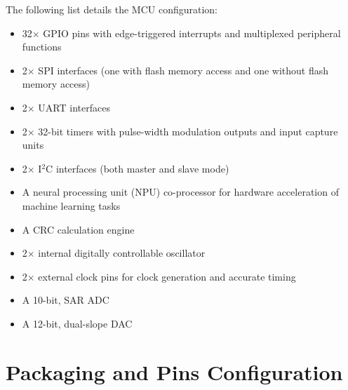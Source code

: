 \documentclass[11pt,pdftex,portrait,letterpaper]{article}
\begin{document}
The following list details the MCU configuration:
\begin{itemize}
	
	\item 32$\times$ GPIO pins with edge-triggered interrupts and multiplexed peripheral functions
	\item 2$\times$ SPI interfaces (one with flash memory access and one without flash memory access)
	\item 2$\times$ UART interfaces
	\item 2$\times$ 32-bit timers with pulse-width modulation outputs and input capture units
	\item 2$\times$ I$^2$C interfaces (both master and slave mode)
	\item A neural processing unit (NPU) co-processor for hardware acceleration of machine learning tasks
	\item A CRC calculation engine
	\item 2$\times$ internal digitally controllable oscillator
	\item 2$\times$ external clock pins for clock generation and accurate timing
	\item A 10-bit, SAR ADC
	\item A 12-bit, dual-slope DAC
\end{itemize}

\newpage



\section{Packaging and Pins Configuration} \label{s:pinsConfig}
\end{document}
